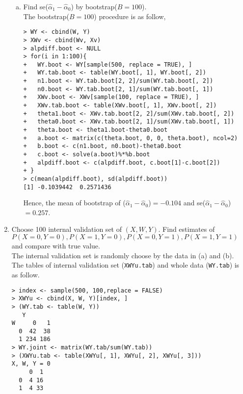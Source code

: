 \begin{enumerate}
\begin{enumerate}[(a)]
\item Find se($\hat\alpha_1-\hat\alpha_0$) by bootstrap($B=100$).\\
The bootstrap($B=100$) procedure is as follow,
\begin{lstlisting}
> WY <- cbind(W, Y)
> XWv <- cbind(Wv, Xv)
> alpdiff.boot <- NULL
> for(i in 1:100){
+   WY.boot <- WY[sample(500, replace = TRUE), ]
+   WY.tab.boot <- table(WY.boot[, 1], WY.boot[, 2])
+   n1.boot <- WY.tab.boot[2, 2]/sum(WY.tab.boot[, 2])
+   n0.boot <- WY.tab.boot[2, 1]/sum(WY.tab.boot[, 1])
+   XWv.boot <- XWv[sample(100, replace = TRUE), ]
+   XWv.tab.boot <- table(XWv.boot[, 1], XWv.boot[, 2])
+   theta1.boot <- XWv.tab.boot[2, 2]/sum(XWv.tab.boot[, 2])
+   theta0.boot <- XWv.tab.boot[2, 1]/sum(XWv.tab.boot[, 1])
+   theta.boot <- theta1.boot-theta0.boot
+   a.boot <- matrix(c(theta.boot, 0, 0, theta.boot), ncol=2) 
+   b.boot <- c(n1.boot, n0.boot)-theta0.boot
+   c.boot <- solve(a.boot)%*%b.boot
+   alpdiff.boot <- c(alpdiff.boot, c.boot[1]-c.boot[2])
+ }
> c(mean(alpdiff.boot), sd(alpdiff.boot))
[1] -0.1039442  0.2571436
\end{lstlisting}
Hence, the mean of bootstrap of ($\hat\alpha_1-\hat\alpha_0$)$=-0.104$ and se($\hat\alpha_1-\hat\alpha_0$)$=0.257$.

\end{enumerate}
\item Choose 100 internal validation set of $(X, W, Y)$. Find estimates of $P(X=0, Y=0), P(X=1, Y=0),P(X=0, Y=1), P(X=1, Y=1)$ and compare with true value.\\
The internal validation set is randomly choose by the data in (a) and (b). The tables of internal validation set (\texttt{XWYu.tab}) and whole data (\texttt{WY.tab}) is as follow.
\begin{lstlisting}
> index <- sample(500, 100,replace = FALSE)
> XWYu <- cbind(X, W, Y)[index, ]
> (WY.tab <- table(W, Y))
   Y
W     0   1
  0  42  38
  1 234 186
> WY.joint <- matrix(WY.tab/sum(WY.tab))
> (XWYu.tab <- table(XWYu[, 1], XWYu[, 2], XWYu[, 3]))
X, W, Y = 0 
     0  1
  0  4 16
  1  4 33


\end{lstlisting}
\end{enumerate}

